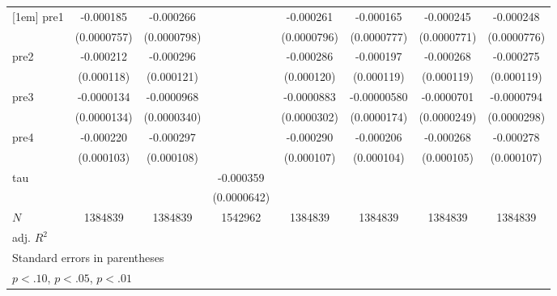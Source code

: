 \begin{table}[htbp]
\begin{tabular}{l*{7}{c}}
[1em]
pre1        &   -0.000185\sym{**} &   -0.000266\sym{***}&                     &   -0.000261\sym{***}&   -0.000165\sym{**} &   -0.000245\sym{***}&   -0.000248\sym{***}\\
            & (0.0000757)         & (0.0000798)         &                     & (0.0000796)         & (0.0000777)         & (0.0000771)         & (0.0000776)         \\
[1em]
pre2        &   -0.000212\sym{*}  &   -0.000296\sym{**} &                     &   -0.000286\sym{**} &   -0.000197\sym{*}  &   -0.000268\sym{**} &   -0.000275\sym{**} \\
            &  (0.000118)         &  (0.000121)         &                     &  (0.000120)         &  (0.000119)         &  (0.000119)         &  (0.000119)         \\
[1em]
pre3        &  -0.0000134         &  -0.0000968\sym{***}&                     &  -0.0000883\sym{***}& -0.00000580         &  -0.0000701\sym{***}&  -0.0000794\sym{***}\\
            & (0.0000134)         & (0.0000340)         &                     & (0.0000302)         & (0.0000174)         & (0.0000249)         & (0.0000298)         \\
[1em]
pre4        &   -0.000220\sym{**} &   -0.000297\sym{***}&                     &   -0.000290\sym{***}&   -0.000206\sym{**} &   -0.000268\sym{**} &   -0.000278\sym{***}\\
            &  (0.000103)         &  (0.000108)         &                     &  (0.000107)         &  (0.000104)         &  (0.000105)         &  (0.000107)         \\
[1em]
tau         &                     &                     &   -0.000359\sym{***}&                     &                     &                     &                     \\
            &                     &                     & (0.0000642)         &                     &                     &                     &                     \\
\hline
\(N\)       &     1384839         &     1384839         &     1542962         &     1384839         &     1384839         &     1384839         &     1384839         \\
adj. \(R^{2}\)&                     &                     &                     &                     &                     &                     &                     \\
\hline\hline
\multicolumn{8}{l}{\footnotesize Standard errors in parentheses}\\
\multicolumn{8}{l}{\footnotesize \sym{*} \(p<.10\), \sym{**} \(p<.05\), \sym{***} \(p<.01\)}\\
\end{tabular}
\end{table}
